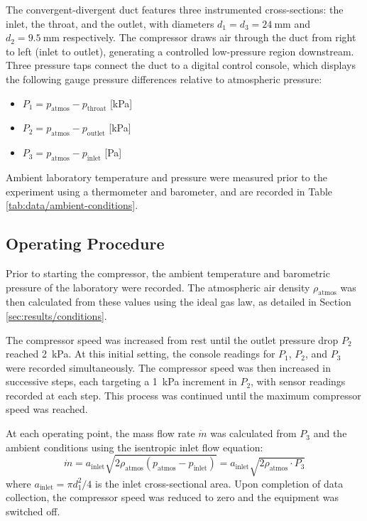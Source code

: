 The convergent-divergent duct features three instrumented cross-sections: the inlet, the throat, and the outlet, with diameters \( d_1 = d_3 = \qty{24}{\mm} \) and \( d_2 = \qty{9.5}{\mm} \) respectively. The compressor draws air through the duct from right to left (inlet to outlet), generating a controlled low-pressure region downstream. Three pressure taps connect the duct to a digital control console, which displays the following gauge pressure differences relative to atmospheric pressure:
\begin{itemize}
    \item \( P_1 = p_\text{atmos} - p_\text{throat} \) \hfill [\unit{\kPa}]
    \item \( P_2 = p_\text{atmos} - p_\text{outlet} \) \hfill [\unit{\kPa}]
    \item \( P_3 = p_\text{atmos} - p_\text{inlet}  \) \hfill [\unit{\Pa}]
\end{itemize}
Ambient laboratory temperature and pressure were measured prior to the experiment using a thermometer and barometer, and are recorded in Table \ref{tab:data/ambient-conditions}.

\subsection{Operating Procedure} \label{sec:methodology/procedure}

Prior to starting the compressor, the ambient temperature and barometric pressure of the laboratory were recorded. The atmospheric air density \( \rho_\text{atmos} \) was then calculated from these values using the ideal gas law, as detailed in Section \ref{sec:results/conditions}.

The compressor speed was increased from rest until the outlet pressure drop \( P_2 \) reached \qty{2}{\kPa}. At this initial setting, the console readings for \( P_1 \), \( P_2 \), and \( P_3 \) were recorded simultaneously. The compressor speed was then increased in successive steps, each targeting a \qty{1}{\kPa} increment in \( P_2 \), with sensor readings recorded at each step. This process was continued until the maximum compressor speed was reached.

At each operating point, the mass flow rate \( \dot{m} \) was calculated from \( P_3 \) and the ambient conditions using the isentropic inlet flow equation:
\begin{equation}
    \dot{m} = a_\text{inlet} \sqrt{2 \rho_\text{atmos} \left( p_\text{atmos} - p_\text{inlet} \right)}
            = a_\text{inlet} \sqrt{2 \rho_\text{atmos} \cdot P_3}
    \label{eq:mdot-inlet}
\end{equation}
where \( a_\text{inlet} = \pi d_1^2 / 4 \) is the inlet cross-sectional area. Upon completion of data collection, the compressor speed was reduced to zero and the equipment was switched off.

